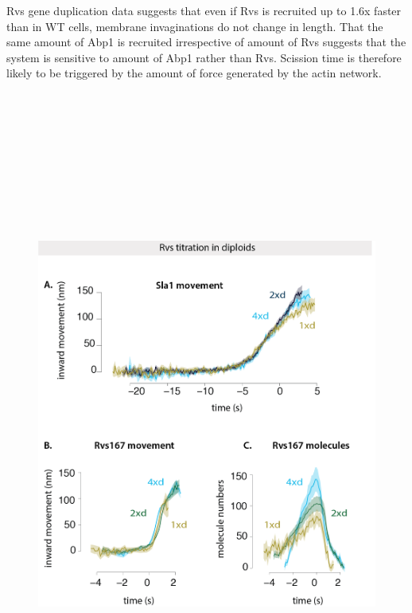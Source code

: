 Rvs gene duplication data suggests that even if Rvs is recruited up to 1.6x faster than in WT cells, membrane invaginations do not change in length. That the same amount of Abp1 is recruited irrespective of amount of Rvs suggests that the system is sensitive to amount of Abp1 rather than Rvs. Scission time is therefore likely to be triggered by the amount of force generated by the actin network. 



\newpage
						\begin{figure}[H]
						\centering
						\includegraphics[width=22cm,height=22cm,keepaspectratio]{figures/results_final/protein_friction4}

\end{figure}
